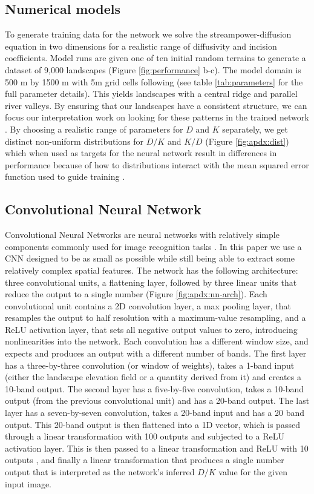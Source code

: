 \documentclass[draft]{agujournal2019}
\begin{document}
\subsection{Numerical models}
\label{sec:orge88de69}
To generate training data for the network we solve the streampower-diffusion equation in two dimensions for a realistic range of diffusivity and incision coefficients.  Model runs are given one of ten initial random terrains to generate a dataset of 9,000 landscapes (Figure \ref{fig:performance} b-c).  The model domain is 500 m by 1500 m with 5m grid cells following \cite{perronControlsSpacingFirstorder2008} (see table \ref{tab:parameters} for the full parameter details).  This yields landscapes with a central ridge and parallel river valleys.  By ensuring that our landscapes have a consistent structure, we can focus our interpretation work on looking for these patterns in the trained network .  By choosing a realistic range of parameters for \(D\) and \(K\) separately, we get distinct non-uniform distributions for \(D/K\) and \(K/D\) (Figure \ref{fig:apdx:dist}) which when used as targets for the neural network result in differences in performance because of how to distributions interact with the mean squared error function used to guide training \cite{hodsonRootmeansquareErrorRMSE2022}.
\subsection{Convolutional Neural Network}
\label{sec:orgb87ba14}
Convolutional Neural Networks are neural networks with relatively simple components  commonly used for image recognition tasks \cite{qinHowConvolutionalNeural2018}.  In this paper we use a CNN designed to be as small as possible while still being able to extract some relatively complex spatial features.  The network has the following architecture: three convolutional units, a flattening layer, followed by three linear units that reduce the output to a single number (Figure \ref{fig:apdx:nn-arch}).  Each convolutional unit contains a 2D convolution layer, a max pooling layer, that resamples the output to half resolution with a maximum-value resampling, and a ReLU activation layer, that sets all negative output values to zero, introducing nonlinearities into the network.  Each convolution has a different window size, and expects and produces an output with a different number of bands.  The first layer has a three-by-three convolution (or window of weights), takes a 1-band input (either the landscape elevation field or a quantity derived from it) and creates a 10-band output.  The second layer has a five-by-five convolution, takes a 10-band output (from the previous convolutional unit) and has a 20-band output.  The last layer has a seven-by-seven convolution, takes a 20-band input and has a 20 band output.  This 20-band output is then flattened into a 1D vector, which is passed through a linear transformation with 100 outputs and subjected to a ReLU activation layer.  This is then passed to a linear transformation and ReLU with 10 outputs , and finally a linear transformation that produces a single number output that is interpreted as the network's inferred \(D/K\) value for the given input image.
\end{document}
